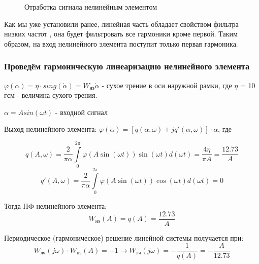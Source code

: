 \documentclass[main.tex]{subfiles}
\begin{document}
\begin{figure}[h]
    \caption{Отработка сигнала нелинейным элементом}
\end{figure}
Как мы уже установили ранее, линейная часть обладает свойством фильтра
 низких частот , она будет фильтровать все гармоники кроме первой. Таким образом, 
 на вход нелинейного элемента поступит только первая гармоника.\par 

 \subsubsection*{Проведём гармоническую линеаризацию нелинейного элемента}
\( \varphi(\dot{\alpha}) = \eta\cdot sing(\dot{\alpha}) = W_\text{нэ}\dot{\alpha}\) - сухое трение в оси наружной рамки, 
где \( \eta \) = 10 гсм - величина сухого трения. \par 

\( \alpha = A sin(\omega t) \) - входной сигнал \par 

Выход нелинейного элемента: \( \varphi(\dot{\alpha}) =
 [q(\alpha, \omega) + jq'(\alpha,\omega)]\cdot \alpha \), где

 \[ q(A,\omega) = \frac{2}{\pi\alpha}\int\limits^{2\pi}_0 \varphi(A\sin(\omega t))\sin(\omega t)d(\omega t) 
    = \frac{4\eta}{\pi A} = \frac{12.73}{A} \]
\[ q'(A,\omega) = \frac{2}{\pi\alpha}\int\limits^{2\pi}_0 \varphi(A\sin(\omega t))\cos(\omega t)d(\omega t) = 0 \]
 
Тогда ПФ нелинейного элемента:
 \[ W_\text{нэ}(A) = q(A) = \frac{12.73}{A}\]

 Периодическое (гармоническое) решение линейной системы получается при:
  \[ W_\text{лч}(j\omega)\cdot W_\text{нэ}(A) = -1 \rightarrow  W_\text{лч}(j\omega) = 
        -\frac{1}{q(A)} = -\frac{A}{12.73}\]
 
\end{document}
